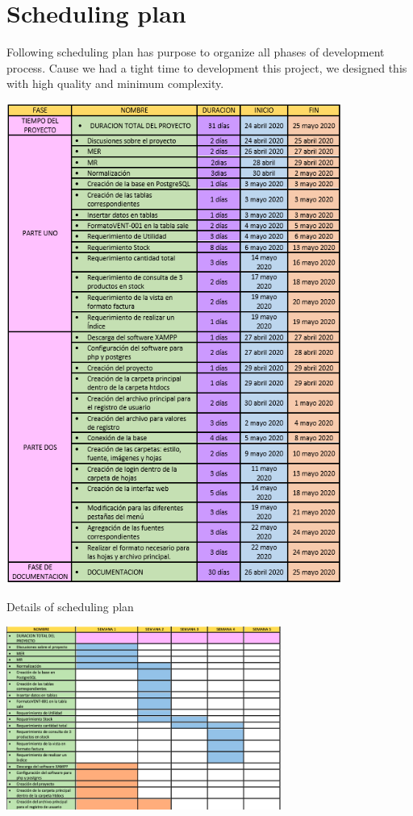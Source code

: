 \documentclass{article}
\begin{document}
\section{Scheduling plan}
Following scheduling plan has purpose to organize all phases of development process. Cause we had a tight time to development this project, we designed this with high quality and minimum complexity.
\begin{center}
\includegraphics[width=11cm]{cronograma}
\end{center}
Details of scheduling plan
\begin{center}
\includegraphics[width=9cm]{crono2}
\end{center}
\end{document}
